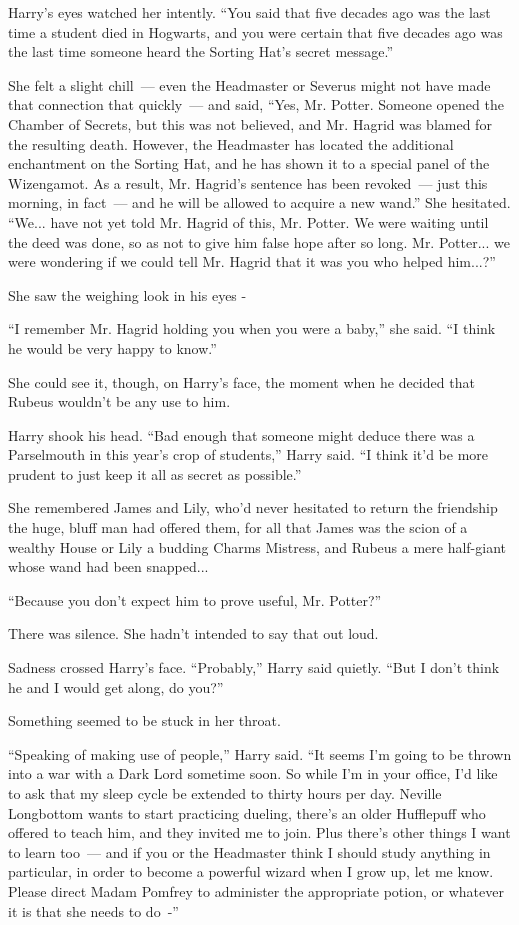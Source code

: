 Harry's eyes watched her intently. ``You said that five decades ago was the last time a student died in Hogwarts, and you were certain that five decades ago was the last time someone heard the Sorting Hat's secret message.''

She felt a slight chill~--- even the Headmaster or Severus might not have made that connection that quickly~--- and said, ``Yes, Mr. Potter. Someone opened the Chamber of Secrets, but this was not believed, and Mr. Hagrid was blamed for the resulting death. However, the Headmaster has located the additional enchantment on the Sorting Hat, and he has shown it to a special panel of the Wizengamot. As a result, Mr. Hagrid's sentence has been revoked~--- just this morning, in fact~--- and he will be allowed to acquire a new wand.'' She hesitated. ``We... have not yet told Mr. Hagrid of this, Mr. Potter. We were waiting until the deed was done, so as not to give him false hope after so long. Mr. Potter... we were wondering if we could tell Mr. Hagrid that it was you who helped him...?''

She saw the weighing look in his eyes -

``I remember Mr. Hagrid holding you when you were a baby,'' she said. ``I think he would be very happy to know.''

She could see it, though, on Harry's face, the moment when he decided that Rubeus wouldn't be any use to him.

Harry shook his head. ``Bad enough that someone might deduce there was a Parselmouth in this year's crop of students,'' Harry said. ``I think it'd be more prudent to just keep it all as secret as possible.''

She remembered James and Lily, who'd never hesitated to return the friendship the huge, bluff man had offered them, for all that James was the scion of a wealthy House or Lily a budding Charms Mistress, and Rubeus a mere half-giant whose wand had been snapped...

``Because you don't expect him to prove useful, Mr. Potter?''

There was silence. She hadn't intended to say that out loud.

Sadness crossed Harry's face. ``Probably,'' Harry said quietly. ``But I don't think he and I would get along, do you?''

Something seemed to be stuck in her throat.

``Speaking of making use of people,'' Harry said. ``It seems I'm going to be thrown into a war with a Dark Lord sometime soon. So while I'm in your office, I'd like to ask that my sleep cycle be extended to thirty hours per day. Neville Longbottom wants to start practicing dueling, there's an older Hufflepuff who offered to teach him, and they invited me to join. Plus there's other things I want to learn too~--- and if you or the Headmaster think I should study anything in particular, in order to become a powerful wizard when I grow up, let me know. Please direct Madam Pomfrey to administer the appropriate potion, or whatever it is that she needs to do~-''

